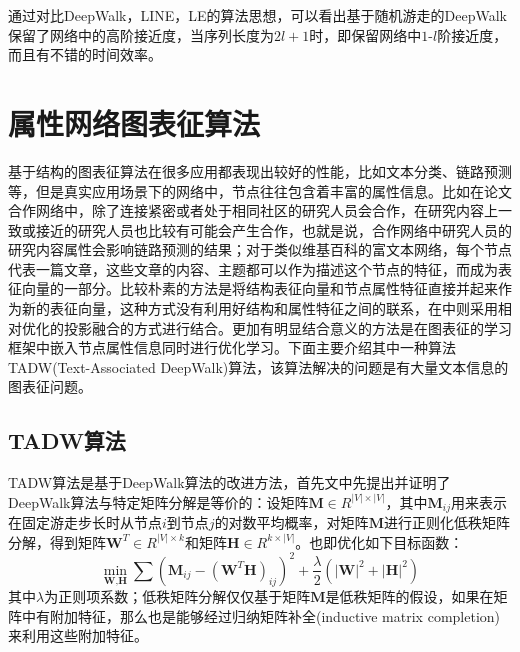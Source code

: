 通过对比DeepWalk，LINE，LE的算法思想，可以看出基于随机游走的DeepWalk保留了网络中的高阶接近度，当序列长度为$2l+1$时，即保留网络中$1\mbox{-}l$阶接近度，而且有不错的时间效率。
\section{属性网络图表征算法}
基于结构的图表征算法在很多应用都表现出较好的性能，比如文本分类、链路预测等，但是真实应用场景下的网络中，节点往往包含着丰富的属性信息。比如在论文合作网络中，除了连接紧密或者处于相同社区的研究人员会合作，在研究内容上一致或接近的研究人员也比较有可能会产生合作，也就是说，合作网络中研究人员的研究内容属性会影响链路预测的结果；对于类似维基百科的富文本网络，每个节点代表一篇文章，这些文章的内容、主题都可以作为描述这个节点的特征，而成为表征向量的一部分。比较朴素的方法是将结构表征向量和节点属性特征直接并起来作为新的表征向量，这种方式没有利用好结构和属性特征之间的联系，在\cite{li2017attributed}中则采用相对优化的投影融合的方式进行结合。更加有明显结合意义的方法是在图表征的学习框架中嵌入节点属性信息同时进行优化学习。下面主要介绍其中一种算法TADW(Text-Associated DeepWalk)\cite{yang2015network}算法，该算法解决的问题是有大量文本信息的图表征问题。

\subsection{TADW算法}
TADW算法是基于DeepWalk算法的改进方法，首先文中先提出并证明了DeepWalk算法与特定矩阵分解是等价的：设矩阵$\textbf{M}\in R^{|V|\times |V|}$，其中$\textbf{M}_{ij}$用来表示在固定游走步长时从节点$i$到节点$j$的对数平均概率，对矩阵$\textbf{M}$进行正则化低秩矩阵分解\cite{yu2014large}，得到矩阵$\textbf{W}^T \in R^{|V| \times k}$和矩阵$\textbf{H} \in R^{k\times |V|}$。也即优化如下目标函数：
\begin{equation}
	\min_{\textbf{W},\textbf{H}} \sum(\textbf{M}_{ij}-(\textbf{W}^T\textbf{H})_{ij})^2 +\frac{\lambda}{2}(|\textbf{W}|^2+|\textbf{H}|^2)
\end{equation}
其中$\lambda$为正则项系数；低秩矩阵分解仅仅基于矩阵$\textbf{M}$是低秩矩阵的假设，如果在矩阵中有附加特征，那么也是能够经过归纳矩阵补全(inductive matrix completion)\cite{natarajan2014inductive}来利用这些附加特征。

